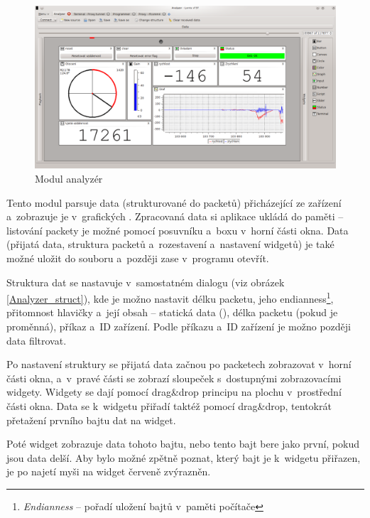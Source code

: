 \documentclass[12pt, a4paper, oneside]{article}
\newcommand{\It}{\textit}  %
\begin{document}
\begin{figure}[h]
\begin{center}
\includegraphics[width=\textwidth]{img/analyzer_all.png}
\caption{Modul analyzér}
\label{Analyzer}
\end{center}
\end{figure}

Tento modul parsuje data (strukturované do packetů) přicházející ze zařízení a~zobrazuje je v~grafických . Zpracovaná data si aplikace ukládá do paměti -- listování packety je možné pomocí posuvníku a~boxu v~horní části okna. Data (přijatá data, struktura packetů a~rozestavení a~nastavení widgetů) je také možné uložit do souboru a~později zase v~programu otevřít.

Struktura dat se nastavuje v~samostatném dialogu (viz obrázek \ref{Analyzer_struct}), kde je možno nastavit délku packetu, jeho endianness\footnote{\It{Endianness} -- pořadí uložení bajtů v~paměti počítače}, přitomnost hlavičky a~její obsah -- statická data (), délka packetu (pokud je proměnná), příkaz a~ID zařízení. Podle příkazu a~ID zařízení je možno později data filtrovat.

\newpage
\setlength{\voffset}{0mm} %
\pagestyle{plain}

Po nastavení struktury se přijatá data začnou po packetech zobrazovat v~horní části okna, a~v~pravé části se zobrazí sloupeček s~dostupnými zobrazovacími widgety. Widgety se dají pomocí drag\&drop principu  na plochu v~prostřední části okna. Data se k~widgetu přiřadí taktéž pomocí drag\&drop, tentokrát přetažení prvního bajtu dat na widget. 

Poté widget zobrazuje data tohoto bajtu, nebo tento bajt bere jako první, pokud jsou data delší. Aby bylo možné zpětně poznat, který bajt je k~widgetu přiřazen, je po najetí myši na widget červeně zvýrazněn.
\end{document}
